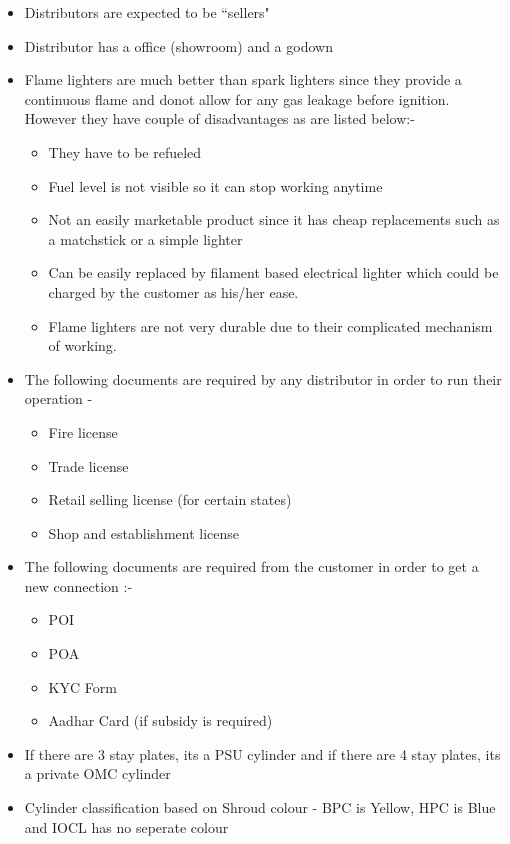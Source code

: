 \documentclass{report}
\begin{document}
	\begin{itemize}
		\item Distributors are expected to be ``sellers"
		\item Distributor has a office (showroom) and a godown
		\item Flame lighters are much better than spark lighters since they provide a continuous flame and donot allow for any gas leakage before ignition. However they have couple of disadvantages as are listed below:-
		\begin{itemize}
			\item They have to be refueled 
			\item Fuel level is not visible so it can stop working anytime
			\item Not an easily marketable product since it has cheap replacements such as a matchstick or a simple lighter
			\item Can be easily replaced by filament based electrical lighter which could be charged by the customer as his/her ease.
			\item Flame lighters are not very durable due to their complicated mechanism of working.
		\end{itemize}
		\item The following documents are required by any distributor in order to run their operation -
		\begin{itemize}
			\item Fire license
			\item Trade license
			\item Retail selling license (for certain states) 
			\item Shop and establishment license
		\end{itemize}
		\item The following documents are required from the customer in order to get a new connection :-
		\begin{itemize}
			\item POI
			\item POA
			\item KYC Form
			\item Aadhar Card (if subsidy is required)
		\end{itemize}
		\item If there are 3 stay plates, its a PSU cylinder and if there are 4 stay plates, its a private OMC cylinder
		\item Cylinder classification based on Shroud colour - BPC is Yellow, HPC is Blue and IOCL has no seperate colour 

\end{itemize}
\end{document}
